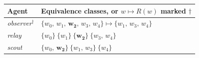 \begin{tabular}{@{}ll@{}}
\toprule
\textbf{Agent} & \textbf{Equivalence classes, or $w \mapsto R(w)$ marked }$\dagger$ \\
\midrule
\textit{observer}$^{\dagger}$ & $\{w_{0},\,w_{1},\,\mathbf{w_{2}},\,w_{3},\,w_{4}\} \mapsto \{w_{1},\,w_{3},\,w_{4}\}$ \\
\textit{relay} & $\{w_{0}\}\ \{w_{1}\}\ \{\mathbf{w_{2}}\}\ \{w_{3},\,w_{4}\}$ \\
\textit{scout} & $\{w_{0},\,\mathbf{w_{2}}\}\ \{w_{1},\,w_{3}\}\ \{w_{4}\}$ \\
\bottomrule
\end{tabular}
